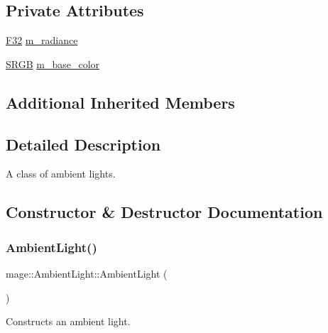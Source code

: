 \subsection*{Private Attributes}
\begin{DoxyCompactItemize}
\item 
\hyperlink{namespacemage_aa97e833b45f06d60a0a9c4fc22ae02c0}{F32} \hyperlink{classmage_1_1_ambient_light_a579aff19284637d89d85026b373574aa}{m\+\_\+radiance}
\item 
\hyperlink{structmage_1_1_s_r_g_b}{S\+R\+GB} \hyperlink{classmage_1_1_ambient_light_ae23403481bf3d82082c4955b7b5a2c52}{m\+\_\+base\+\_\+color}
\end{DoxyCompactItemize}
\subsection*{Additional Inherited Members}


\subsection{Detailed Description}
A class of ambient lights. 

\subsection{Constructor \& Destructor Documentation}
\hypertarget{classmage_1_1_ambient_light_a9f1aa7ecfbb56ecc10f8d149272e0f51}{}\label{classmage_1_1_ambient_light_a9f1aa7ecfbb56ecc10f8d149272e0f51} 
\subsubsection{\texorpdfstring{Ambient\+Light()}{AmbientLight()}\hspace{0.1cm}{\footnotesize\ttfamily [1/3]}}
{\footnotesize\ttfamily mage\+::\+Ambient\+Light\+::\+Ambient\+Light (\begin{DoxyParamCaption}{ }\end{DoxyParamCaption})\hspace{0.3cm}{\ttfamily [noexcept]}}

Constructs an ambient light. \hypertarget{classmage_1_1_ambient_light_acd05bee97c195c1a18242879008bf4ae}{}\label{classmage_1_1_ambient_light_acd05bee97c195c1a18242879008bf4ae} 
